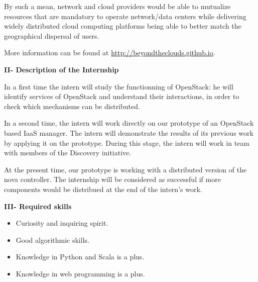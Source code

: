 \documentclass{letter}
\begin{document}
\begin{letter}
By such a mean, network and cloud providers would be able to mutualize resources
that are mandatory to operate network/data centers while delivering widely 
distributed cloud computing platforms being able to better match the 
geographical dispersal of users.

More information can be found at 
\href{http://beyondtheclouds.github.io}{http://beyondtheclouds.github.io}.


{\Large \textbf{II- Description of the Internship}}

In a first time the intern will study the functionning of OpenStack: he will
identify services of OpenStack and understand their interactions, in order to
check which mechanisms can be distributed.

In a second time, the intern will work directly on our prototype of an OpenStack 
based IaaS manager. The intern will demonstrate the results of its previous work
by applying it on the prototype. During this stage, the intern will work in team
with members of the Discovery initiative.

At the present time, our prototype is working with a distributed version of the
nova controller. The internship will be considered as successful if more 
components would be distribued at the end of the intern's work.

{\Large \textbf{III- Required skills}}

\begin{itemize}
\item Curiosity and inquiring spirit.
\item Good algorithmic skills.
\item Knowledge in Python and Scala is a plus.
\item Knowledge in web programming is a plus.
\end{itemize}

\end{letter}
\end{document}
